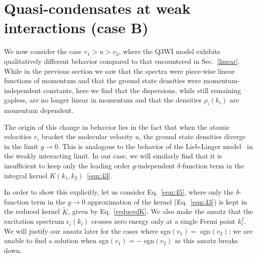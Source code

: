 \documentclass[aps,pra,
superscriptaddress,
reprint,twocolumn,preprintnumbers,
amsmath,amssymb,
nofootinbib]{revtex4-1}
\begin{document}
        \section{Quasi-condensates at weak interactions (case B)}
        \label{condensate}        
        
We now consider the case $v_1 > u > v_2$, where the Q3WI model exhibits qualitatively different behavior compared to that encountered in Sec.~\ref{linear}. While in the previous section we saw that the spectra were piece-wise linear functions of momentum and that the ground state densities were momentum-independent constants, here we find that the dispersions, while still remaining gapless, are no longer linear in momentum and that the densities $\rho_i(k_i)$ are momentum dependent. 

The origin of this change in behavior lies in the fact that when the atomic velocities $v_i$ bracket the molecular velocity $u$, the ground state densities diverge in the limit $g\to 0$. This is analogous to the behavior of the Lieb-Linger model~\cite{LiebLiniger,Lieb1963} in the weakly interacting limit. In our case, we will similarly find that it is insufficient to keep only the leading order $g$-independent $\delta$-function term in the integral kernel $K(k_1,k_2)$~\eqref{eqn:43}. 

In order to show this explicitly, let us consider Eq.~\eqref{eqn:45}, where only the $\delta$-function term in the $g\to 0$ approximation of the kernel (Eq.~\eqref{eqn:43}) is kept in the reduced kernel $\tilde{K}$, given by Eq.~\eqref{reducedK}. We also make the ansatz that the excitation spectrum $\epsilon_i(k_i)$ crosses zero energy only at a single Fermi point $k_i^f$. We will justify our ansatz later for the cases where sgn$(v_1) =$ sgn$(v_2)$; we are unable to find a solution when sgn$(v_1) = -$ sgn$(v_2)$ as this ansatz breaks down.         
\end{document}

